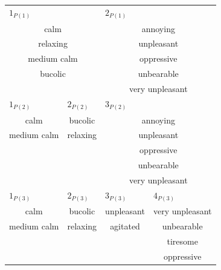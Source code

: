 \begin{table}[t]
\centering
\tiny
\begin{tabular}{c|c|c|c|c|c|c}
\multicolumn{3}{l|}{$1_{P(1)}$}  & \multicolumn{4}{l}{$2_{P(1)}$} \\
\multicolumn{3}{c|}{calm}        & \multicolumn{4}{c}{annoying} \\
\multicolumn{3}{c|}{relaxing}    & \multicolumn{4}{c}{unpleasant} \\
\multicolumn{3}{c|}{medium calm} & \multicolumn{4}{c}{oppressive} \\
\multicolumn{3}{c|}{bucolic}     & \multicolumn{4}{c}{unbearable} \\
\multicolumn{3}{c|}{}            & \multicolumn{4}{c}{very unpleasant} \\                                            
\hline
\multicolumn{2}{l|}{$1_{P(2)}$} & \multicolumn{1}{l|}{$2_{P(2)}$} & \multicolumn{4}{l}{$3_{P(2)}$} \\
\multicolumn{2}{c|}{calm}        & bucolic   & \multicolumn{4}{c}{annoying} \\
\multicolumn{2}{c|}{medium calm} & relaxing  & \multicolumn{4}{c}{unpleasant} \\
\multicolumn{2}{c|}{}            &           & \multicolumn{4}{c}{oppressive} \\
\multicolumn{2}{c|}{}            &           & \multicolumn{4}{c}{unbearable} \\	
\multicolumn{2}{c|}{}            &           & \multicolumn{4}{c}{very unpleasant} \\	
\hline
\multicolumn{2}{l|}{$1_{P(3)}$} & \multicolumn{1}{l|}{$2_{P(3)}$} & \multicolumn{3}{l|}{$3_{P(3)}$} & \multicolumn{1}{l}{$4_{P(3)}$} \\ 
\multicolumn{2}{c|}{calm}        & bucolic  & \multicolumn{3}{c|}{unpleasant} & very unpleasant \\         
\multicolumn{2}{c|}{medium calm} & relaxing & \multicolumn{3}{c|}{agitated}   & unbearable\\ 
\multicolumn{2}{c|}{}            &          & \multicolumn{3}{c|}{}           & tiresome \\ 
\multicolumn{2}{c|}{}            &          & \multicolumn{3}{c|}{}           & oppressive \\ 
                

\end{tabular}
\end{table}
